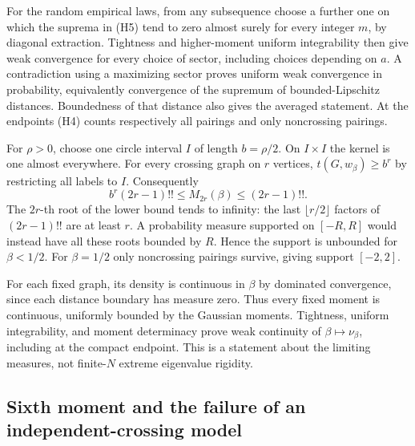 For the random empirical laws, from any subsequence choose a further one
on which the suprema in (H5) tend to zero almost surely for every integer
\(m\), by diagonal extraction. Tightness and higher-moment uniform
integrability then give weak convergence for every choice of sector,
including choices depending on \(a\). A contradiction using a maximizing
sector proves uniform weak convergence in probability, equivalently
convergence of the supremum of bounded-Lipschitz distances. Boundedness of
that distance also gives the averaged statement. At the endpoints (H4)
counts respectively all pairings and only noncrossing pairings.

\begin{corollary}\label{pass1:pell_harmonic_transition-4} For \(\rho>0\), choose
one circle interval \(I\) of length \(b=\rho/2\). On \(I\times I\) the kernel is
one almost everywhere. For every crossing graph on \(r\) vertices,
\(t(G,w_\beta)\ge b^r\) by restricting all labels to \(I\). Consequently
\[
 b^r(2r-1)!!\le M_{2r}(\beta)\le(2r-1)!!.                    \tag{H22}
\]
The \(2r\)-th root of the lower bound tends to infinity: the last
\(\lfloor r/2\rfloor\) factors of \((2r-1)!!\) are at least \(r\).
A probability measure supported on \([-R,R]\) would instead have all these
roots bounded by \(R\). Hence the support is unbounded for \(\beta<1/2\).
For \(\beta=1/2\) only noncrossing pairings survive, giving support \([-2,2]\).
\end{corollary}

For each fixed graph, its density is continuous in \(\beta\) by dominated
convergence, since each distance boundary has measure zero. Thus every
fixed moment is continuous, uniformly bounded by the Gaussian moments.
Tightness, uniform integrability, and moment determinacy prove weak
continuity of \(\beta\mapsto\nu_\beta\), including at the compact endpoint.
This is a statement about the limiting measures, not finite-\(N\) extreme
eigenvalue rigidity.

\hypertarget{pell-harmonic-sixth-moment-and-the-failure-of-an-independent-crossing-model}{%
\subsection{Sixth moment and the failure of an independent-crossing model}\label{pell-harmonic-sixth-moment-and-the-failure-of-an-independent-crossing-model}}

